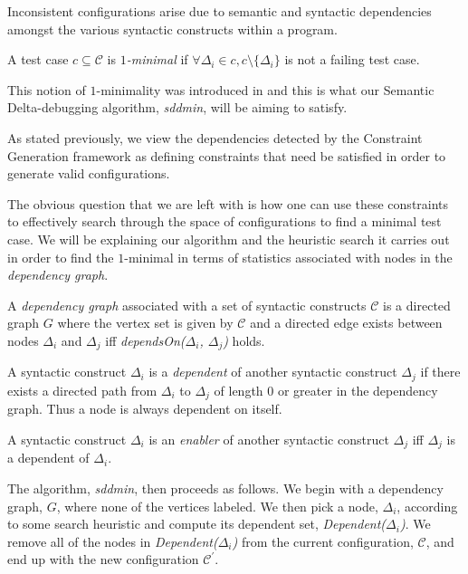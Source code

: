 \documentclass[preprint]{acm_proc_article-sp}
\newenvironment{definition}[1][Definition]{\begin{trivlist}
\item[\hskip \labelsep {\bfseries #1}]}{\end{trivlist}}
\begin{document}
Inconsistent configurations arise due to semantic and syntactic dependencies
amongst the various syntactic constructs within a program.

\begin{definition}
A test case $c \subseteq \mathcal{C}$ is \emph{$1$-minimal} if $\forall \Delta_i
\in c, c \setminus \{ \Delta_i \}$ is not a failing test case.
\end{definition}

This notion of $1$-minimality was introduced in \citep{zeller99} and this is
what our Semantic Delta-debugging algorithm, \emph{sddmin}, will be aiming to
satisfy. 

As stated previously, we view the dependencies detected by the Constraint
Generation framework as defining constraints that need be satisfied in order to
generate valid configurations.

The obvious question that we are left with is how one can use these constraints
to effectively search through the space of configurations to find a minimal test
case. We will be explaining our algorithm and the heuristic search it carries
out in order to find the $1$-minimal in terms of statistics associated with
nodes in the \emph{dependency graph}.

\begin{definition}
A \emph{dependency graph} associated with a set of syntactic constructs
$\mathcal{C}$ is a directed graph $G$ where the vertex set is given by
$\mathcal{C}$ and a directed edge exists between nodes $\Delta_i$ and $\Delta_j$
iff \emph{dependsOn($\Delta_i$, $\Delta_j$)} holds.
\end{definition}

\begin{definition}
A syntactic construct $\Delta_i$ is a \emph{dependent} of another syntactic
construct $\Delta_j$ if there exists a directed path from $\Delta_i$ to
$\Delta_j$ of length $0$ or greater in the dependency graph. Thus a node is
always dependent on itself.
\end{definition}

\begin{definition}
A syntactic construct $\Delta_i$ is an \emph{enabler} of another syntactic
construct $\Delta_j$ iff $\Delta_j$ is a dependent of $\Delta_i$.
\end{definition}

The algorithm, \emph{sddmin}, then proceeds as follows. We begin with a
dependency graph, $G$, where none of the vertices labeled. We then pick a node,
$\Delta_i$, according to some search heuristic and compute its dependent set,
\emph{Dependent($\Delta_i$)}. We remove all of the nodes in
\emph{Dependent($\Delta_i$)} from the current configuration, $\mathcal{C}$, and
end up with the new configuration $\mathcal{C}^{'}$. 
\end{document}
